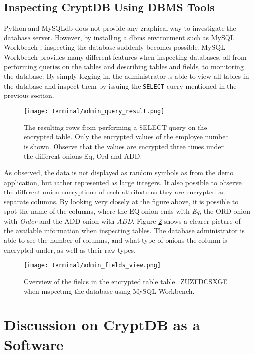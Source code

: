 \newpage
\subsection{Inspecting CryptDB Using DBMS Tools}

Python and MySQLdb does not provide any graphical way to investigate the database server. However, by installing a \gls{dbms} environment such as MySQL Workbench \cite{mysql_workbench}, inspecting the database suddenly becomes possible. MySQL Workbench provides many different features when inspecting databases, all from performing queries on the tables and describing tables and fields, to 
monitoring the database. By simply logging in, the administrator is able to view all tables in the database and inspect them by issuing the \verb!SELECT! query mentioned in the previous section.

\begin{figure}[h]
	\centering
	\texttt{[image: terminal/admin\_query\_result.png]}
	\caption{The resulting rows from performing a SELECT query on the encrypted table. Only the encrypted values of the employee number is shown. Observe that the values are encrypted three times under the different onions Eq, Ord and ADD.}
	\label{fig:admin_query_result}
\end{figure}

As observed, the data is not displayed as random symbols as from the demo application, but rather represented as large integers. It also possible to observe the different onion encryptions of each attribute as they are encrypted as separate columns. By looking very closely at the figure above, it is possible to spot the name of the columns, where the EQ-onion ends with \emph{Eq}, the ORD-onion with \emph{Order} and the ADD-onion with \emph{ADD}. Figure \ref{fig:admin_fields_view} shows a clearer picture of the available information when inspecting tables. The database administrator is able to see the number of columns, and what type of onions the column is encrypted under, as well as their raw types.

\begin{figure}[h]
	\centering
	\texttt{[image: terminal/admin\_fields\_view.png]}
	\caption{Overview of the fields in the encrypted table table\_ZUZFDCSXGE when inspecting the database using MySQL Workbench.}
	\label{fig:admin_fields_view}
\end{figure}

\section{Discussion on CryptDB as a Software}


